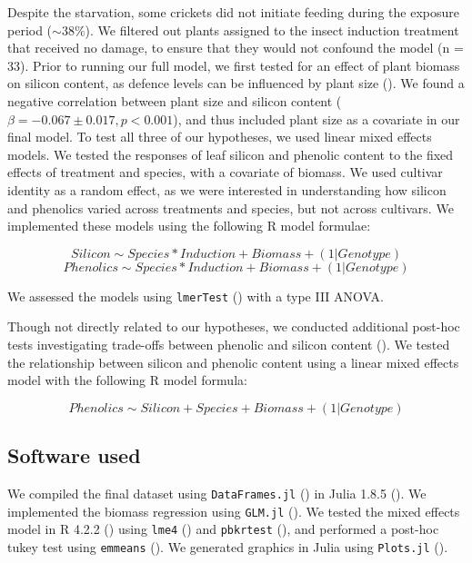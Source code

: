 \documentclass[12pt, letterpaper, ]{report}
\begin{document}
Despite the starvation, some crickets did not initiate feeding during the exposure period ($\sim38\%$). We filtered out plants assigned to the insect induction treatment that received no damage, to ensure that they would not confound the model (n = 33). Prior to running our full model, we first tested for an effect of plant biomass on silicon content, as defence levels can be influenced by plant size (\cite{carmona_plant_2011}). We found a negative correlation between plant size and silicon content ($\beta = -0.067 \pm 0.017, p < 0.001$), and thus included plant size as a covariate in our final model. To test all three of our hypotheses, we used linear mixed effects models. We tested the responses of leaf silicon and phenolic content to the fixed effects of treatment and species, with a covariate of biomass. We used cultivar identity as a random effect, as we were interested in understanding how silicon and phenolics varied across treatments and species, but not across cultivars. We implemented these models using the following R model formulae:

\[Silicon \sim Species * Induction + Biomass + (1|Genotype)\]
\[Phenolics \sim Species * Induction + Biomass + (1|Genotype)\]

We assessed the models using \verb|lmerTest| (\cite{kuznetsova_2017_lmerTest}) with a type III ANOVA. 

Though not directly related to our hypotheses, we conducted additional post-hoc tests investigating trade-offs between phenolic and silicon content (\cite{simpson_still_2017,waterman_short-term_2021}). We tested the relationship between silicon and phenolic content using a linear mixed effects model with the following R model formula:

\[Phenolics \sim Silicon + Species + Biomass + (1|Genotype)\]

\subsection{Software used}

We compiled the final dataset using \verb|DataFrames.jl| (\cite{bogumil_kaminski_2023_7632427}) in Julia 1.8.5 (\cite{bezanson2017julia}). We implemented the biomass regression using \verb|GLM.jl| (\cite{douglas_bates_2023_7529836}). We tested the mixed effects model in R 4.2.2 (\cite{r_core_team_2022}) using \verb|lme4| (\cite{lme4_bates_2015}) and \verb|pbkrtest| (\cite{halekoh_pbkrtest_2014}), and performed a post-hoc tukey test using \verb|emmeans| (\cite{lenth_2023_emmeans}). We generated graphics in Julia using \verb|Plots.jl| (\cite{tom_breloff_2023_7736124}). 
\end{document}
